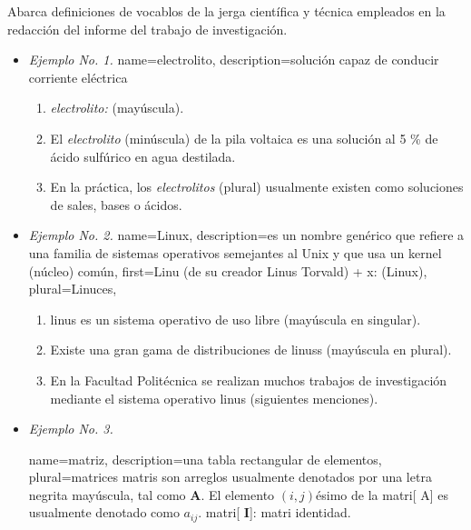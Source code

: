 Abarca definiciones de vocablos de la jerga científica y técnica empleados en la redacción del informe del trabajo de investigación.
\begin{itemize}

\item \textit{Ejemplo No. 1.}
{
name=electrolito,
description={solución capaz de conducir corriente eléctrica}
}
\begin{enumerate}
\item \textit{\Gls{electrolito}:} (mayúscula).
\item El \textit{\gls{electrolito}} (minúscula) de la pila voltaica es una solución al 5 \% de ácido sulfúrico en agua destilada.
\item En la práctica, los \textit{\glspl{electrolito}} (plural) usualmente existen como soluciones de sales, bases o ácidos.
\end{enumerate}

\item \textit{Ejemplo No. 2.}
{
  name=Linux,
  description={es un nombre genérico que refiere a una familia de sistemas operativos
  			  semejantes al Unix y que usa un kernel (núcleo) común},
  first={Linu (de su creador Linus Torvald) + x:  (Linux)},
  plural={Linuces},
}

\begin{enumerate}
\item \Gls{linus} es un sistema operativo de uso libre (mayúscula en singular).
\item Existe una gran gama de distribuciones de  \Glspl{linus} (mayúscula en plural).
\item En la Facultad Politécnica se realizan muchos trabajos de investigación mediante el sistema operativo \gls{linus} (siguientes menciones).
\end{enumerate}

\item \textit{Ejemplo No. 3.}

{
name={matriz},%
description={una tabla rectangular de elementos},%
plural={matrices}%
}
\Glspl{matri} son arreglos usualmente denotados por una letra negrita mayúscula, tal como $\mathbf{A}$. El elemento $(i,j)$ésimo de la \gls{matri}[ A]  es usualmente denotado como $a_{ij}$. \Gls{matri}[ $\mathbf{I}$]: \gls{matri} identidad.

\end{itemize}

